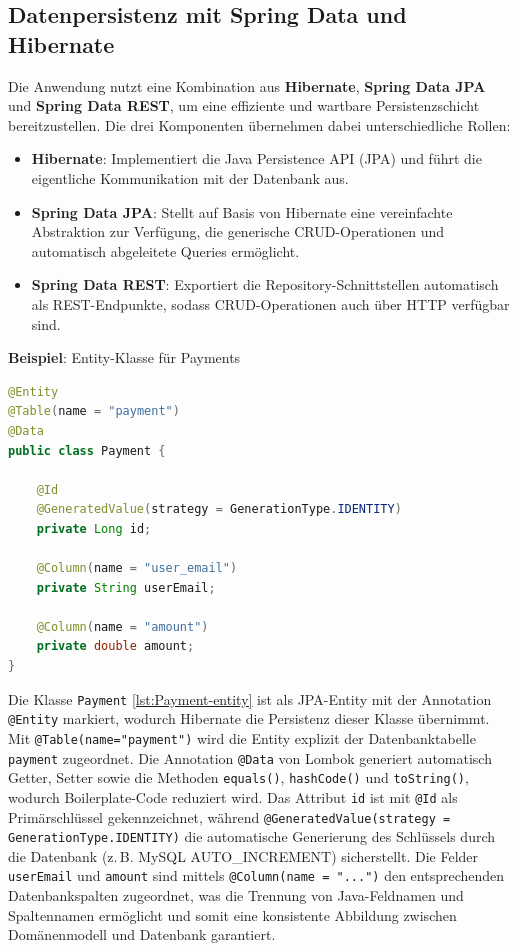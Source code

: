 \subsection{Datenpersistenz mit Spring Data und Hibernate}

Die Anwendung nutzt eine Kombination aus \textbf{Hibernate}, \textbf{Spring Data JPA} und \textbf{Spring Data REST}, um eine effiziente und wartbare Persistenzschicht bereitzustellen. Die drei Komponenten übernehmen dabei unterschiedliche Rollen:

\begin{itemize}
	\item \textbf{Hibernate}: Implementiert die Java Persistence API (JPA) und führt die eigentliche Kommunikation mit der Datenbank aus.
	\item \textbf{Spring Data JPA}: Stellt auf Basis von Hibernate eine vereinfachte Abstraktion zur Verfügung, die generische CRUD-Operationen und automatisch abgeleitete Queries ermöglicht.
	\item \textbf{Spring Data REST}: Exportiert die Repository-Schnittstellen automatisch als REST-Endpunkte, sodass CRUD-Operationen auch über HTTP verfügbar sind.
\end{itemize}

\noindent \textbf{Beispiel}: Entity-Klasse für Payments

\begin{lstlisting}[language=Java, caption={JPA-Entity \texttt{Payment}}, label={lst:Payment-entity}]
@Entity
@Table(name = "payment")
@Data
public class Payment {
	
	@Id
	@GeneratedValue(strategy = GenerationType.IDENTITY)
	private Long id;
	
	@Column(name = "user_email")
	private String userEmail;
	
	@Column(name = "amount")
	private double amount;
}
\end{lstlisting}

\noindent Die Klasse \texttt{Payment} \ref{lst:Payment-entity} ist als JPA-Entity mit der Annotation \texttt{@Entity} markiert, wodurch Hibernate die Persistenz dieser Klasse übernimmt. Mit \texttt{@Table(name="payment")} wird die Entity explizit der Datenbanktabelle \texttt{payment} zugeordnet. Die Annotation \texttt{@Data} von Lombok generiert automatisch Getter, Setter sowie die Methoden \texttt{equals()}, \texttt{hashCode()} und \texttt{toString()}, wodurch Boilerplate-Code reduziert wird. Das Attribut \texttt{id} ist mit \texttt{@Id} als Primärschlüssel gekennzeichnet, während \texttt{@GeneratedValue(strategy = GenerationType.IDENTITY)} die automatische Generierung des Schlüssels durch die Datenbank (z.\,B. MySQL AUTO\_INCREMENT) sicherstellt. Die Felder \texttt{userEmail} und \texttt{amount} sind mittels \texttt{@Column(name = "...")} den entsprechenden Datenbankspalten zugeordnet, was die Trennung von Java-Feldnamen und Spaltennamen ermöglicht und somit eine konsistente Abbildung zwischen Domänenmodell und Datenbank garantiert.

